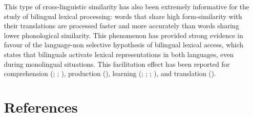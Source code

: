 \documentclass[
]{article}
\begin{document}
This type of cross-linguistic similarity has also been extremely
informative for the study of bilingual lexical processing: words that
share high form-similarity with their translations are processed faster
and more accurately than words sharing lower phonological similarity.
This phenomenon has provided strong evidence in favour of the
language-non selective hypothesis of bilingual lexical access, which
states that bilinguals activate lexical representations in both
languages, even during monolingual situations. This facilitation effect
has been reported for comprehension
(;
;
), production
(), learning
(;
;
;
), and translation
().

\section{References}\label{references}
\end{document}
